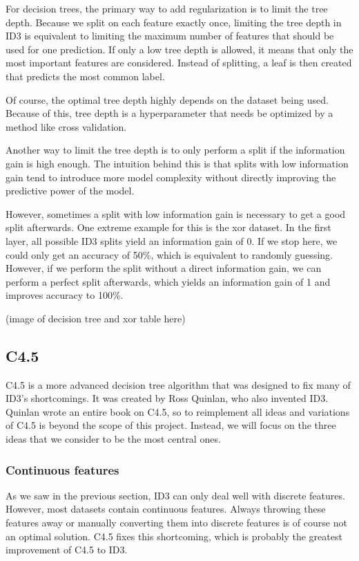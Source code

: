 \documentclass[a4paper]{article}
\begin{document}
For decision trees, the primary way to add regularization is to limit the tree depth. Because we split on each feature exactly once, limiting the tree depth in ID3 is equivalent to limiting the maximum number of features that should be used for one prediction. If only a low tree depth is allowed, it means that only the most important features are considered. Instead of splitting, a leaf is then created that predicts the most common label.

Of course, the optimal tree depth highly depends on the dataset being used. Because of this, tree depth is a hyperparameter that needs be optimized by a method like cross validation.

Another way to limit the tree depth is to only perform a split if the information gain is high enough. The intuition behind this is that splits with low information gain tend to introduce more model complexity without directly improving the predictive power of the model.

However, sometimes a split with low information gain is necessary to get a good split afterwards. One extreme example for this is the xor dataset. In the first layer, all possible ID3 splits yield an information gain of 0. If we stop here, we could only get an accuracy of 50\%, which is equivalent to randomly guessing. However, if we perform the split without a direct information gain, we can perform a perfect split afterwards, which yields an information gain of 1 and improves accuracy to 100\%.

(image of decision tree and xor table here)

\subsection{C4.5}

C4.5 is a more advanced decision tree algorithm that was designed to fix many of ID3's shortcomings. It was created by Ross Quinlan, who also invented ID3. Quinlan wrote an entire book on C4.5, so to reimplement all ideas and variations of C4.5 is beyond the scope of this project. Instead, we will focus on the three ideas that we consider to be the most central ones.

\subsubsection{Continuous features}

As we saw in the previous section, ID3 can only deal well with discrete features. However, most datasets contain continuous features. Always throwing these features away or manually converting them into discrete features is of course not an optimal solution. C4.5 fixes this shortcoming, which is probably the greatest improvement of C4.5 to ID3.
\end{document}
